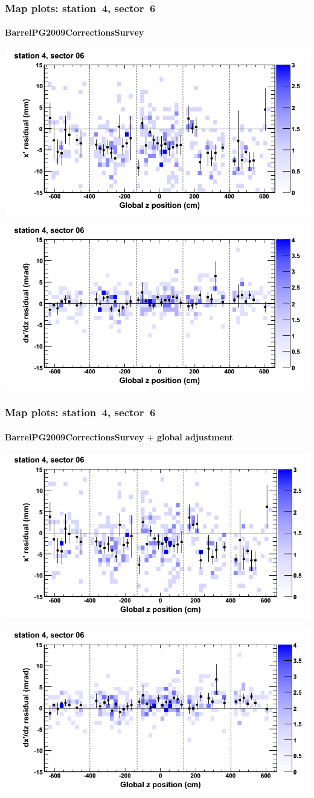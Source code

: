 \documentclass[compress]{beamer}
\begin{document}
\begin{frame}
\frametitle{Map plots: station~4, sector~6}
\framesubtitle{BarrelPG2009CorrectionsSurvey}
\includegraphics[width=0.5\linewidth]{mapplots_01/DTvsz_st4sec06_x.png}

\includegraphics[width=0.5\linewidth]{mapplots_01/DTvsz_st4sec06_dxdz.png}
\end{frame}
\begin{frame}
\frametitle{Map plots: station~4, sector~6}
\framesubtitle{BarrelPG2009CorrectionsSurvey $+$ global adjustment}
\includegraphics[width=0.5\linewidth]{mapplots_re01/DTvsz_st4sec06_x.png}

\includegraphics[width=0.5\linewidth]{mapplots_re01/DTvsz_st4sec06_dxdz.png}
\end{frame}
\end{document}
